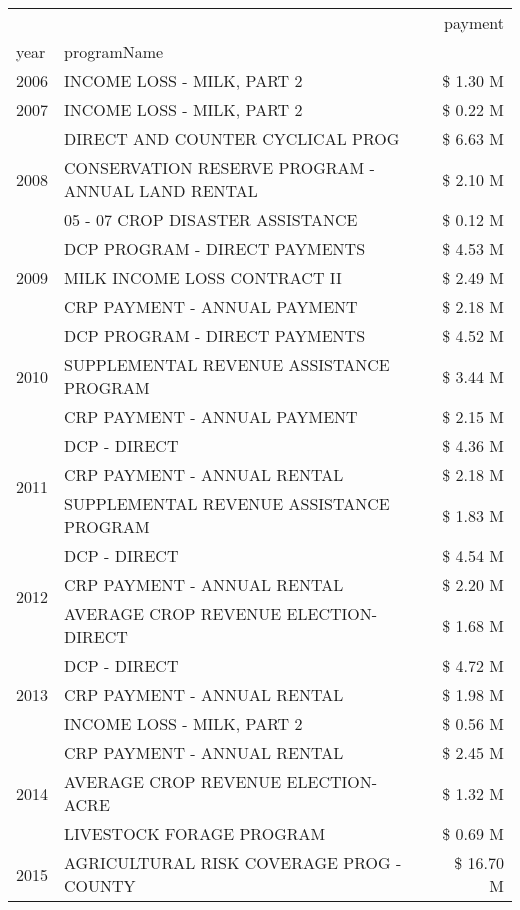 \begin{tabular}{llr}
\toprule
 &  & payment \\
year & programName &  \\
\midrule
2006 & INCOME LOSS - MILK, PART 2 & \$ 1.30 M \\
\cline{1-3}
2007 & INCOME LOSS - MILK, PART 2 & \$ 0.22 M \\
\cline{1-3}
\multirow[t]{3}{*}{2008} & DIRECT AND COUNTER CYCLICAL PROG & \$ 6.63 M \\
 & CONSERVATION RESERVE PROGRAM - ANNUAL LAND RENTAL & \$ 2.10 M \\
 & 05 - 07 CROP DISASTER ASSISTANCE & \$ 0.12 M \\
\cline{1-3}
\multirow[t]{3}{*}{2009} & DCP PROGRAM - DIRECT PAYMENTS & \$ 4.53 M \\
 & MILK INCOME LOSS CONTRACT II & \$ 2.49 M \\
 & CRP PAYMENT - ANNUAL PAYMENT & \$ 2.18 M \\
\cline{1-3}
\multirow[t]{3}{*}{2010} & DCP PROGRAM - DIRECT PAYMENTS & \$ 4.52 M \\
 & SUPPLEMENTAL REVENUE ASSISTANCE PROGRAM & \$ 3.44 M \\
 & CRP PAYMENT - ANNUAL PAYMENT & \$ 2.15 M \\
\cline{1-3}
\multirow[t]{3}{*}{2011} & DCP - DIRECT & \$ 4.36 M \\
 & CRP PAYMENT - ANNUAL RENTAL & \$ 2.18 M \\
 & SUPPLEMENTAL REVENUE ASSISTANCE PROGRAM & \$ 1.83 M \\
\cline{1-3}
\multirow[t]{3}{*}{2012} & DCP - DIRECT & \$ 4.54 M \\
 & CRP PAYMENT - ANNUAL RENTAL & \$ 2.20 M \\
 & AVERAGE CROP REVENUE ELECTION-DIRECT & \$ 1.68 M \\
\cline{1-3}
\multirow[t]{3}{*}{2013} & DCP - DIRECT & \$ 4.72 M \\
 & CRP PAYMENT - ANNUAL RENTAL & \$ 1.98 M \\
 & INCOME LOSS - MILK, PART 2 & \$ 0.56 M \\
\cline{1-3}
\multirow[t]{3}{*}{2014} & CRP PAYMENT - ANNUAL RENTAL & \$ 2.45 M \\
 & AVERAGE CROP REVENUE ELECTION-ACRE & \$ 1.32 M \\
 & LIVESTOCK FORAGE PROGRAM & \$ 0.69 M \\
\cline{1-3}
\multirow[t]{3}{*}{2015} & AGRICULTURAL RISK COVERAGE PROG - COUNTY & \$ 16.70 M \\

\end{tabular}
